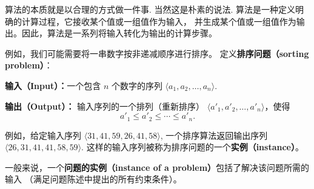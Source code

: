 \documentclass[a4paper]{ctexart}
\theoremstyle{definition}
\newtheorem{definition}{定义}[section]
\theoremstyle{definition}
\newtheorem{example}{例}[section]
\begin{document}
算法的本质就是以合理的方式做一件事. 当然这是朴素的说法. 
算法是一种定义明确的计算过程，它接收某个值或一组值作为输入，
并生成某个值或一组值作为输出。因此，算法是一系列将输入转化为输出的计算步骤。

例如，我们可能需要将一串数字按非递减顺序进行排序。
定义\textbf{排序问题（sorting problem）}：

\textbf{输入（Input）：}一个包含 $n$ 个数字的序列 
$\langle a_1, a_2, \ldots, a_n \rangle$.

\textbf{输出（Output）：} 输入序列的一个排列（重新排序） 
$\langle a'_1, a'_2, \ldots, a'_n \rangle$，使得
\[
a'_1 \leq a'_2 \leq \cdots \leq a'_n.
\]

例如，给定输入序列 $\langle 31, 41, 59, 26, 41, 58 \rangle$, 
一个排序算法返回输出序列 $\langle 26, 31, 41, 41, 58, 59 \rangle$. 
这样的输入序列被称为排序问题的一个\textbf{实例（instance）}。

一般来说，一个\textbf{问题的实例（instance of a problem）}包括了解决该问题所需的输入
（满足问题陈述中提出的所有约束条件）。

  


\end{document}
